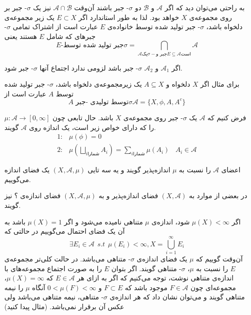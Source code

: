 به راحتی می‌توان دید که اگر 
$ \mathcal{A} $
و 
$ \mathcal{B} $
دو 
$ \sigma $-
جبر باشند آن‌وقت 
$ \mathcal{A} \cap \mathcal{B} $
نیز یک 
$ \sigma $- 
جبر بر روی مجموعه‌ی 
$ X $
خواهد بود. لذا به طور استاندارد اگر 
$ E \subset X $
یک زیر مجموعه‌ی دلخواه باشد، 
$\sigma $- 
جبر تولید شده توسط خانواده‌ی 
$ E $
عبارت است از اشتراک تمامی 
$ \sigma $-
جبرهای که شامل 
$ E $
هستند یعنی 
\begin{equation*}
E \textit{-جبر تولید شده توسط}\sigma = \bigcap_{\mathcal{A} \textit{یک} {\sigma}-\textit{جبر و} E \subseteq \mathcal{A} \textit{است}} \mathcal{A}
\end{equation*}
\begin{remark}
اگر 
$ \mathcal{A}_1 $
و 
$ \mathcal{A}_2 $
$ \sigma $-
جبر باشد لزومی ندارد اجتماع آنها 
$ \sigma $-
جبر شود.
\end{remark}
برای مثال اگر 
$ X $
دلخواه و 
$ A \subseteq X $ 
یک زیرمجموعه‌ی دلخواه باشد،
$ \sigma $-
جبر تولید شده توسط 
$ A $
عبارت است از 
\begin{equation*}
A \textit{ توسط تولیدی -جبر} \sigma \mathcal{A} = \lbrace X, {\phi}, A, A^c \rbrace
\end{equation*}
\begin{definition}[\bf اندازه]
فرض کنیم که 
$ \mathcal{A} $
یک
$ \sigma $-
جبر روی مجموعه‌ی 
$ X $
باشد. حال تابعی چون 
$ \mu : \mathcal{A} \rightarrow [0, \infty] $ 
را که دارای خواص زیر است، یک اندازه روی 
$ \mathcal{A} $
گویند.
\begin{equation*}
\begin{split}
1 : & \mu (\phi) = 0 \\
2: & \mu (\bigsqcup_{i \textit{شمارا}} A_i) = \sum_{i \textit{شمارا}} \mu (A_i) \ \ \ \ A_i \in \mathcal{A} 
\end{split}
\end{equation*}
\end{definition}
اعضای 
$ \mathcal{A} $
را نسبت به 
$ \mu $
اندازه‌پذیر گویند و یه سه تایی 
$ (X, \mathcal{A}, \mu) $
یک فضای اندازه می‌گوییم.
\begin{remark}
در بعضی از موارد به 
$ (X, \mathcal{A}) $
فضای اندازه‌پذیر و به 
$ (X, \mathcal{A}, \mu) $
فضای اندازه‌ی ؟ نیز گویند.
\end{remark}
\begin{remark}
اگر 
$ \mu(X) < \infty $
شود، اندازه‌ی 
$ \mu $
متناهی نامیده می‌شود و اگر 
$ \mu (X) = 1 $
باشد به آن یک فضای احتمال می‌گوییم در حالتی که 
\begin{equation*}
\exists E_i \in \mathcal{A} \ \ s.t \ \ \mu (E_i) < \infty , X = \bigcup^{\infty}_{i = 1} E_i
\end{equation*}
آن‌وقت گوییم که 
$ \mu $
یک فضای اندازه‌ی 
$ \sigma $-
متناهی می‌باشد. در حالت کلی‌تر مجموعه‌ی 
$ E $
را نسبت به 
$ \mu $،
$ \sigma $-
متناهی گویند. اگر بتوان 
$ E $
را به صورت اجتماع مجموعه‌های  با اندازه‌ی متناهی نوشت، توجه می‌کنیم که اگر به ازای هر
$ E \in \mathcal{A} $
که 
$ \mu (X) = \infty $، 
مجموعه‌ای چون 
$ F \in \mathcal{A} $
موجود باشد که 
$ F \subset E $
و 
$ 0 < \mu (F) < \infty $
آنگاه 
$ \mu $
را نیمه متناهی گویند و می‌توان نشان داد که هر اندازه‌ی 
$ \sigma $-
متناهی، نیمه متناهی می‌باشد ولی عکس آن برقرار نمی‌باشد. (مثال پیدا کنید)
\end{remark}
